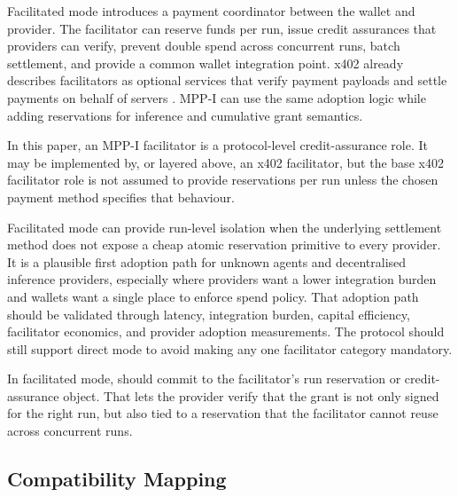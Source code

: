 \documentclass[11pt]{article}
\newcommand{\field}[1]{\texttt{\detokenize{#1}}}
\newcommand{\mppi}{MPP-I}
\begin{document}
Facilitated mode introduces a payment coordinator between the wallet and provider. The facilitator can reserve funds per run, issue credit assurances that providers can verify, prevent double spend across concurrent runs, batch settlement, and provide a common wallet integration point. x402 already describes facilitators as optional services that verify payment payloads and settle payments on behalf of servers \cite{x402facilitator}. \mppi{} can use the same adoption logic while adding reservations for inference and cumulative grant semantics.

In this paper, an \mppi{} facilitator is a protocol-level credit-assurance role. It may be implemented by, or layered above, an x402 facilitator, but the base x402 facilitator role is not assumed to provide reservations per run unless the chosen payment method specifies that behaviour.

Facilitated mode can provide run-level isolation when the underlying settlement method does not expose a cheap atomic reservation primitive to every provider. It is a plausible first adoption path for unknown agents and decentralised inference providers, especially where providers want a lower integration burden and wallets want a single place to enforce spend policy. That adoption path should be validated through latency, integration burden, capital efficiency, facilitator economics, and provider adoption measurements. The protocol should still support direct mode to avoid making any one facilitator category mandatory.

In facilitated mode, \field{claim_reference_hash} should commit to the facilitator's run reservation or credit-assurance object. That lets the provider verify that the grant is not only signed for the right run, but also tied to a reservation that the facilitator cannot reuse across concurrent runs.

\subsection{Compatibility Mapping}
\end{document}
